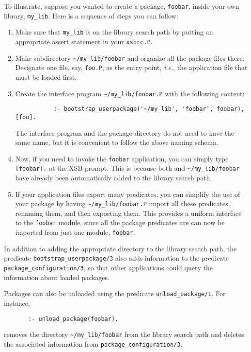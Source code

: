 To illustrate, suppose you wanted to create a package, {\tt foobar}, inside
your own library, {\tt my\_lib}. Here is a sequence of steps you can
follow:  
\begin{enumerate}
\item Make sure that {\tt my\_lib} is on the library search path by putting
  an appropriate assert statement in your {\tt xsbrc.P}.
\item Make subdirectory \verb|~/my_lib/foobar| and organize all the
  package files there. Designate one file, say, {\tt foo.P}, as the
  entry point, {\it i.e.}, the application file that must be loaded first.
\item Create the interface program \verb|~/my_lib/foobar.P| with the
  following content:
    \begin{verbatim}
           :- bootstrap_userpackage('~/my_lib', 'foobar', foobar), [foo].
    \end{verbatim}
  The interface program and the package directory do not need to have the
  same name, but it is convenient to follow the above naming schema.
\item Now, if you need to invoke the {\tt foobar} application, you can
  simply type \verb|[foobar].| at the XSB prompt. This is because both and
  \verb|~/my_lib/foobar| have already been automatically added to the
  library search path.
\item If your application files export many predicates, you can simplify
  the use of your package by having \verb|~/my_lib/foobar.P| import all
  these predicates, renaming them, and then exporting them. This provides a
  uniform interface to the {\tt foobar} module, since all the package
  predicates are can now be imported from just one module, {\tt foobar}.
\end{enumerate}
In addition to adding the appropriate directory to the library search path,
the predicate \verb|bootstrap_userpackage/3| also adds information to the
predicate \verb|package_configuration/3|, so that other applications could
query the information about loaded packages.

Packages can also be unloaded using the predicate
\verb|unload_package/1|. For instance, 

\begin{verbatim}
       :- unload_package(foobar).  
\end{verbatim}
removes the directory \verb|~/my_lib/foobar| from the library search path
and deletes the associated information from \verb|package_configuration/3|.


